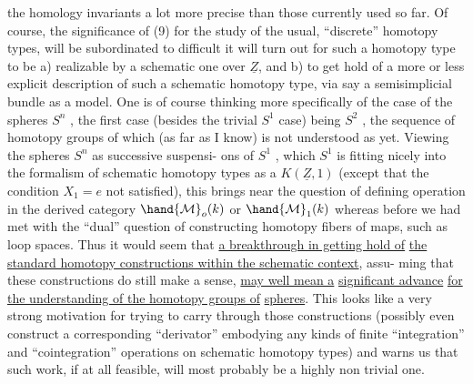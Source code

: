 
the homology invariants a lot more precise than those currently used so
far.  Of course,  the significance of (9) for the study of the usual,
``discrete'' homotopy types,  will be subordinated to  difficult it will
turn out for such a homotopy type to be  a) realizable by a schematic
one over $\underline{Z}$,  and  b) to get hold of a more or less explicit
description of  such a schematic homotopy type,  via say a semisimplicial
bundle as a model.  One is of course thinking more specifically of the
case of the spheres $S^n$ ,  the first case (besides the trivial $S^1$ case)
being $S^2$ ,  the sequence of homotopy groups of which (as far as I know)
is not understood as yet.  Viewing the spheres $S^n$ as successive suspensi-%
ons of $S^1$ ,  which $S^1$ is fitting nicely into the formalism of schematic
homotopy types as a $K(\underline{Z},1)$  (except that the  condition $X_1=e$   not 
satisfied),  this brings near the question of defining   operation
in the  derived category $\hand{\mathcal{M}}_o(k)$ or $\hand{\mathcal{M}}_1(k)$\unsure{,} \hand{(}whereas before we had met with
the ``dual'' question of constructing homotopy fibers of maps,  such as
loop spaces\hand{)}.  Thus it would seem that \uline{a breakthrough in getting hold of}
\uline{the standard homotopy constructions within the schematic context},  assu-%
ming that these constructions do still make a sense,  \uline{may well mean a}
\uline{significant advance}  \uline{for the understanding of the homotopy groups of}
\uline{spheres}.  This  looks like a very strong motivation for
trying to  carry through those constructions (possibly even
construct a corresponding ``derivator'' embodying any kinds of finite
``integration'' and ``cointegration'' operations on schematic homotopy types)\hand{,}
and  warns us that such work,  if at all feasible,  will most probably be
a highly non trivial one.

